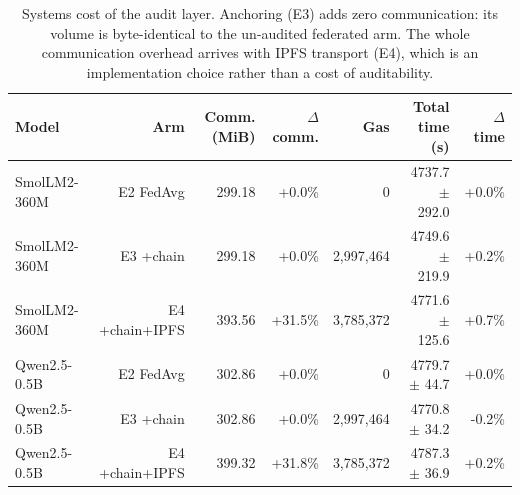 \begin{table}[t]
\centering
\small
\caption{Systems cost of the audit layer. Anchoring (E3) adds zero communication: its volume is byte-identical to the un-audited federated arm. The whole communication overhead arrives with IPFS transport (E4), which is an implementation choice rather than a cost of auditability.}
\label{tab:systems}
\begin{tabular}{lrrrrrr}
\toprule
\textbf{Model} & \textbf{Arm} & \textbf{Comm. (MiB)} & \textbf{$\Delta$ comm.} & \textbf{Gas} & \textbf{Total time (s)} & \textbf{$\Delta$ time} \\
\midrule
SmolLM2-360M & E2 FedAvg & 299.18 & +0.0\% & 0 & 4737.7 $\pm$ 292.0 & +0.0\% \\
SmolLM2-360M & E3 +chain & 299.18 & +0.0\% & 2,997,464 & 4749.6 $\pm$ 219.9 & +0.2\% \\
SmolLM2-360M & E4 +chain+IPFS & 393.56 & +31.5\% & 3,785,372 & 4771.6 $\pm$ 125.6 & +0.7\% \\
Qwen2.5-0.5B & E2 FedAvg & 302.86 & +0.0\% & 0 & 4779.7 $\pm$ 44.7 & +0.0\% \\
Qwen2.5-0.5B & E3 +chain & 302.86 & +0.0\% & 2,997,464 & 4770.8 $\pm$ 34.2 & -0.2\% \\
Qwen2.5-0.5B & E4 +chain+IPFS & 399.32 & +31.8\% & 3,785,372 & 4787.3 $\pm$ 36.9 & +0.2\% \\
\bottomrule
\end{tabular}
\end{table}

